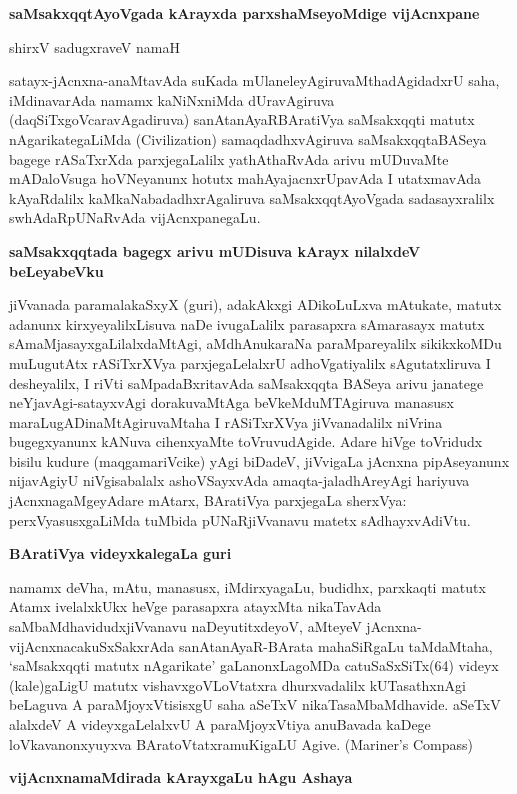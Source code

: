 \textbf{saMsakxqqtAyoVgada kArayxda parxshaMseyoMdige vijAcnxpane}

\begin{center}
shirxV sadugxraveV namaH
\end{center}

satayx-jAcnxna-anaMtavAda suKada mUlaneleyAgiruvaMthadAgidadxrU saha, iMdinavarAda namamx kaNiNxniMda dUravAgiruva (daqSiTxgoVcaravAgadiruva) sanAtanAyaRBAratiVya saMsakxqqti matutx nAgarikategaLiMda {\rm (Civilization)} samaqdadhxvAgiruva saMsakxqqtaBASeya bagege rASaTxrXda parxjegaLalilx yathAthaRvAda arivu mUDuvaMte mADaloVsuga hoVNeyanunx hotutx mahAyajacnxrUpavAda I utatxmavAda kAyaRdalilx kaMkaNabadadhxrAgaliruva saMsakxqqtAyoVgada sadasayxralilx swhAdaRpUNaRvAda vijAcnxpanegaLu.

\textbf{saMsakxqqtada bagegx arivu mUDisuva kArayx nilalxdeV beLeyabeVku}

jiVvanada paramalakaSxyX (guri), adakAkxgi ADikoLuLxva mAtukate, matutx adanunx kirxyeyalilxLisuva naDe ivugaLalilx parasapxra sAmarasayx matutx sAmaMjasayxgaLilalxdaMtAgi, aMdhAnukaraNa paraMpareyalilx sikikxkoMDu muLugutAtx rASiTxrXVya parxjegaLelalxrU adhoVgatiyalilx sAgutatxliruva I desheyalilx, I riVti saMpadaBxritavAda saMsakxqqta BASeya arivu janatege neYjavAgi-satayxvAgi dorakuvaMtAga beVkeMduMTAgiruva manasusx maraLugADinaMtAgiruvaMtaha I rASiTxrXVya jiVvanadalilx niVrina bugegxyanunx kANuva cihenxyaMte toVruvudAgide. Adare hiVge toVridudx bisilu kudure (maqgamariVcike) yAgi biDadeV, jiVvigaLa jAcnxna pipAseyanunx nijavAgiyU niVgisabalalx ashoVSayxvAda amaqta-jaladhAreyAgi hariyuva jAcnxnagaMgeyAdare mAtarx, BAratiVya parxjegaLa sherxVya: perxVyasusxgaLiMda tuMbida pUNaRjiVvanavu matetx sAdhayxvAdiVtu.

\textbf{BAratiVya videyxkalegaLa guri}

namamx deVha, mAtu, manasusx, iMdirxyagaLu, budidhx, parxkaqti matutx Atamx ivelalxkUkx heVge parasapxra atayxMta nikaTavAda saMbaMdhavidudxjiVvanavu naDeyutitxdeyoV, aMteyeV jAcnxna-vijAcnxnacakuSxSakxrAda sanAtanAyaR-BArata mahaSiRgaLu taMdaMtaha, `saMsakxqqti matutx nAgarikate' gaLanonxLagoMDa catuSaSxSiTx(64) videyx (kale)gaLigU matutx vishavxgoVLoVtatxra dhurxvadalilx kUTasathxnAgi beLaguva A paraMjoyxVtisisxgU saha aSeTxV nikaTasaMbaMdhavide. aSeTxV
alalxdeV A videyxgaLelalxvU A paraMjoyxVtiya anuBavada kaDege loVkavanonxyuyxva BAratoVtatxramuKigaLU Agive. {(\rm Mariner's Compass)}

\textbf{vijAcnxnamaMdirada kArayxgaLu hAgu Ashaya}

